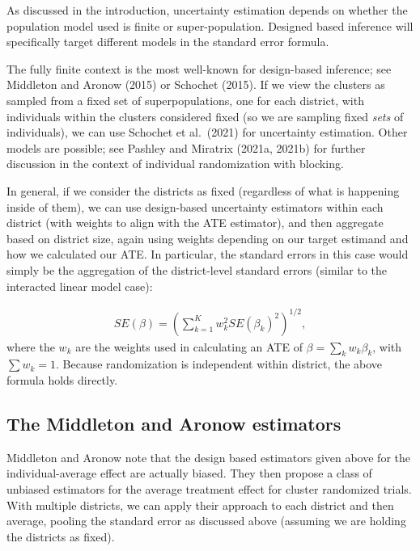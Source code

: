 \documentclass[12pt]{article}
\begin{document}
As discussed in the introduction, uncertainty estimation depends on whether the population model used is finite or super-population.
Designed based inference will specifically target different models in the standard error formula.

The fully finite context is the most well-known for design-based inference; see Middleton and Aronow (2015) or Schochet (2015).
If we view the clusters as sampled from a fixed set of superpopulations, one for each district, with individuals within the clusters considered fixed (so we are sampling fixed \emph{sets} of individuals), we can use Schochet et al.~(2021) for uncertainty estimation.
Other models are possible; see Pashley and Miratrix (2021a, 2021b) for further discussion in the context of individual randomization with blocking.

In general, if we consider the districts as fixed (regardless of what is happening inside of them), we can use design-based uncertainty estimators within each district (with weights to align with the ATE estimator), and then aggregate based on district size, again using weights depending on our target estimand and how we calculated our ATE.
In particular, the standard errors in this case would simply be the aggregation of the district-level standard errors (similar to the interacted linear model case):

\begin{align*}
	SE( \beta ) = \left( \sum_{k=1}^K w_k^2 SE( \beta_k )^2 \right)^{1/2},
\end{align*}
where the $w_k$ are the weights used in calculating an ATE of $\beta = \sum_k w_k \beta_k$, with $\sum w_k = 1$.
Because randomization is independent within district, the above formula holds directly.



\subsection{The Middleton and Aronow estimators}
\label{sec:middleton}

Middleton and Aronow note that the design based estimators given above for the individual-average effect are actually biased.
They then propose a class of unbiased estimators for the average treatment effect for cluster randomized trials.
With multiple districts, we can apply their approach to each district and then average, pooling the standard error as discussed above (assuming we are holding the districts as fixed).
\end{document}
